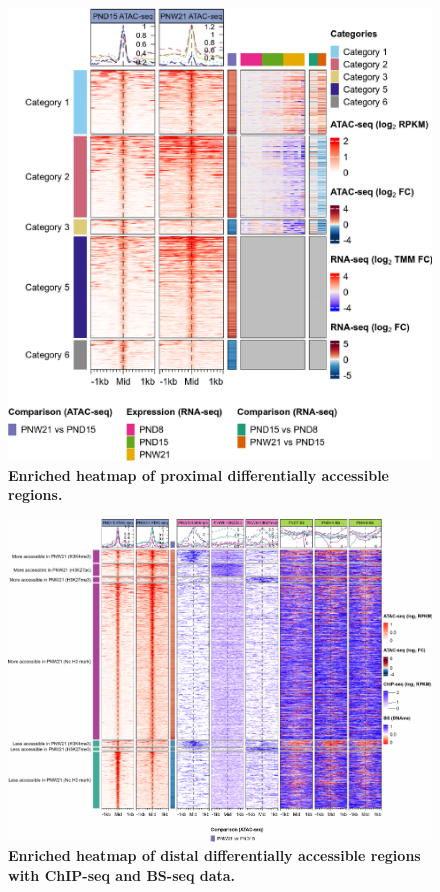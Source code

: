 \documentclass[12pt,twoside]{reedthesis}
\begin{document}
\begin{figure}[htbp]

{\centering \includegraphics{thesis_files/figure-latex/dn5-1} 

}

\caption[Enriched heatmap of proximal DARs]{\textbf{Enriched heatmap of proximal differentially accessible regions.}}\label{fig:dn5}
\end{figure}

\begin{figure}[htbp]

{\centering \includegraphics{thesis_files/figure-latex/dn6-1} 

}

\caption[Enriched heatmap of distal DARs with ChIP-seq and BS-seq data]{\textbf{Enriched heatmap of distal differentially accessible regions with ChIP-seq and BS-seq data.}}\label{fig:dn6}
\end{figure}
\end{document}
